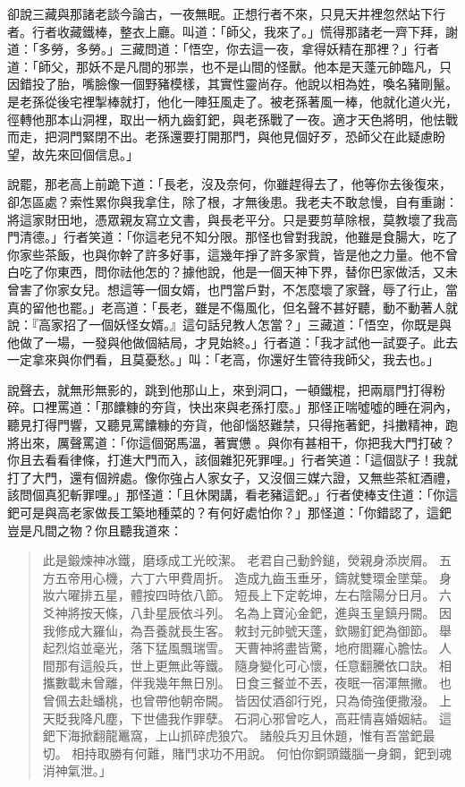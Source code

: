 卻說三藏與那諸老談今論古，一夜無眠。正想行者不來，只見天井裡忽然站下行者。行者收藏鐵棒，整衣上廳。叫道：「師父，我來了。」慌得那諸老一齊下拜，謝道：「多勞，多勞。」三藏問道：「悟空，你去這一夜，拿得妖精在那裡？」行者道：「師父，那妖不是凡間的邪祟，也不是山間的怪獸。他本是天蓬元帥臨凡，只因錯投了胎，嘴臉像一個野豬模樣，其實性靈尚存。他說以相為姓，喚名豬剛鬣。是老孫從後宅裡掣棒就打，他化一陣狂風走了。被老孫著風一棒，他就化道火光，徑轉他那本山洞裡，取出一柄九齒釘鈀，與老孫戰了一夜。適才天色將明，他怯戰而走，把洞門緊閉不出。老孫還要打開那門，與他見個好歹，恐師父在此疑慮盼望，故先來回個信息。」

說罷，那老高上前跪下道：「長老，沒及奈何，你雖趕得去了，他等你去後復來，卻怎區處？索性累你與我拿住，除了根，才無後患。我老夫不敢怠慢，自有重謝：將這家財田地，憑眾親友寫立文書，與長老平分。只是要剪草除根，莫教壞了我高門清德。」行者笑道：「你這老兒不知分限。那怪也曾對我說，他雖是食腸大，吃了你家些茶飯，也與你幹了許多好事，這幾年掙了許多家貲，皆是他之力量。他不曾白吃了你東西，問你祛他怎的？據他說，他是一個天神下界，替你巴家做活，又未曾害了你家女兒。想這等一個女婿，也門當戶對，不怎麼壞了家聲，辱了行止，當真的留他也罷。」老高道：「長老，雖是不傷風化，但名聲不甚好聽，動不動著人就說：『高家招了一個妖怪女婿。』這句話兒教人怎當？」三藏道：「悟空，你既是與他做了一場，一發與他做個結局，才見始終。」行者道：「我才試他一試耍子。此去一定拿來與你們看，且莫憂愁。」叫：「老高，你還好生管待我師父，我去也。」

說聲去，就無形無影的，跳到他那山上，來到洞口，一頓鐵棍，把兩扇門打得粉碎。口裡罵道：「那饢糠的夯貨，快出來與老孫打麼。」那怪正喘噓噓的睡在洞內，聽見打得門響，又聽見罵饢糠的夯貨，他卻惱怒難禁，只得拖著鈀，抖擻精神，跑將出來，厲聲罵道：「你這個弼馬溫，著實憊𪬯。與你有甚相干，你把我大門打破？你且去看看律條，打進大門而入，該個雜犯死罪哩。」行者笑道：「這個獃子！我就打了大門，還有個辨處。像你強占人家女子，又沒個三媒六證，又無些茶紅酒禮，該問個真犯斬罪哩。」那怪道：「且休閑講，看老豬這鈀。」行者使棒支住道：「你這鈀可是與高老家做長工築地種菜的？有何好處怕你？」那怪道：「你錯認了，這鈀豈是凡間之物？你且聽我道來：
\begin{quote}
此是鍛煉神冰鐵，磨琢成工光皎潔。
老君自己動鈐鎚，熒親身添炭屑。
五方五帝用心機，六丁六甲費周折。
造成九齒玉垂牙，鑄就雙環金墜葉。
身妝六曜排五星，體按四時依八節。
短長上下定乾坤，左右陰陽分日月。
六爻神將按天條，八卦星辰依斗列。
名為上寶沁金鈀，進與玉皇鎮丹闕。
因我修成大羅仙，為吾養就長生客。
敕封元帥號天蓬，欽賜釘鈀為御節。
舉起烈焰並毫光，落下猛風飄瑞雪。
天曹神將盡皆驚，地府閻羅心膽怯。
人間那有這般兵，世上更無此等鐵。
隨身變化可心懷，任意翻騰依口訣。
相攜數載未曾離，伴我幾年無日別。
日食三餐並不丟，夜眠一宿渾無撇。
也曾佩去赴蟠桃，也曾帶他朝帝闕。
皆因仗酒卻行兇，只為倚強便撒潑。
上天貶我降凡塵，下世儘我作罪孽。
石洞心邪曾吃人，高莊情喜婚姻結。
這鈀下海掀翻龍鼉窩，上山抓碎虎狼穴。
諸般兵刃且休題，惟有吾當鈀最切。
相持取勝有何難，賭鬥求功不用說。
何怕你銅頭鐵腦一身鋼，鈀到魂消神氣泄。」
\end{quote}

